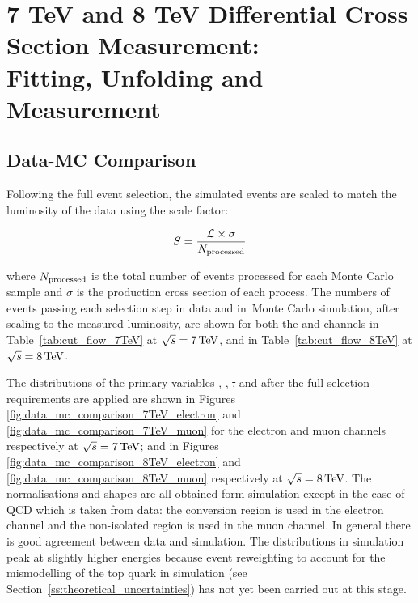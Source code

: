 \chapter{7 TeV and 8 TeV Differential Cross Section Measurement: \\ Fitting, Unfolding and Measurement}
\label{c:Differential_Cross_Section:fitting_unfolding_and_measurement}


\section{Data-MC Comparison}
\label{ss:data-mc_comparison}
Following the full event selection, the simulated events are scaled to match the luminosity of the data using
the scale factor:

\begin{equation}
  S = \frac{{\cal L} \times  \sigma}{N_{\rm processed}}
\end{equation}

where $N_{\rm processed}$ is the total number of events processed for each Monte Carlo sample and $\sigma$ is
the production cross section of each process. The numbers of events passing each selection step in data and
in Monte Carlo simulation, after scaling to the measured luminosity, are shown for both the \eplusjets and
\muplusjets channels in Table~\ref{tab:cut_flow_7TeV} at $\sqrt{s}=7\,\text{Te\hspace{-.08em}V}$, and in Table~\ref{tab:cut_flow_8TeV}
at $\sqrt{s}=8\,\text{Te\hspace{-.08em}V}$.




The distributions of the primary variables \met, \HT, \st, \wpt and \mt after the full selection requirements
are applied are shown in Figures \ref{fig:data_mc_comparison_7TeV_electron} and
\ref{fig:data_mc_comparison_7TeV_muon} for the electron and muon channels respectively at $\sqrt{s}=7\,\text{Te\hspace{-.08em}V}$; and
in Figures \ref{fig:data_mc_comparison_8TeV_electron} and \ref{fig:data_mc_comparison_8TeV_muon} respectively
at $\sqrt{s}=8\,\text{Te\hspace{-.08em}V}$. The normalisations and shapes are all obtained form simulation except in the case of QCD
which is taken from data: the conversion region is used in the electron channel and the non-isolated region is
used in the muon channel. In general there is good agreement between data and simulation. The distributions in
simulation peak at slightly higher energies because event reweighting to account for the \pt mismodelling of
the top quark in simulation (see Section~\ref{ss:theoretical_uncertainties}) has not yet been carried out at
this stage.

